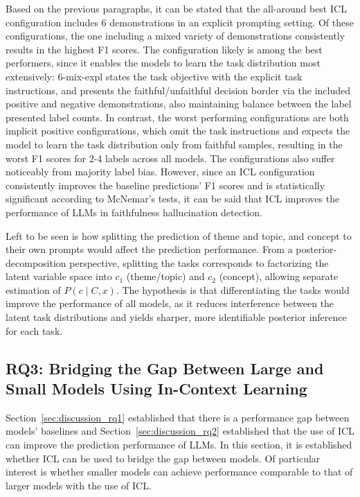 \documentclass[english, 12pt, a4paper, sci, utf8, a-2b, online]{latex/definitions/aaltothesis}
\begin{document}
Based on the previous paragraphs, it can be stated that the all-around best ICL configuration includes 6 demonstrations in an explicit prompting setting. Of these configurations, the one including a mixed variety of demonstrations consistently results in the highest F1 scores. The configuration likely is among the best performers, since it enables the models to learn the task distribution most extensively: 6-mix-expl states the task objective with the explicit task instructions, and presents the faithful/unfaithful decision border via the included positive and negative demonstrations, also maintaining balance between the label presented label counts. In contrast, the worst performing configurations are both implicit positive configurations, which omit the task instructions and expects the model to learn the task distribution only from faithful samples, resulting in the worst F1 scores for 2-4 labels across all models. The configurations also suffer noticeably from majority label bias. However, since an ICL configuration consistently improves the baseline predictions' F1 scores and is statistically significant according to McNemar's tests, it can be said that ICL improves the performance of LLMs in faithfulness hallucination detection.

Left to be seen is how splitting the prediction of theme and topic, and concept to their own prompts would affect the prediction performance. From a posterior-decomposition perspective, splitting the tasks corresponds to factorizing the latent variable space into 
$c_1$ (theme/topic) and $c_2$ (concept), allowing separate estimation of $P(c \mid C, x)$. The hypothesis is that differentiating the tasks would improve the performance of all models, as it reduces interference between the latent task distributions and yields sharper, more identifiable posterior inference for each task.

\subsection{RQ3: Bridging the Gap Between Large and Small Models Using In-Context Learning} \label{sec:discussion_rq3}

Section~\ref{sec:discussion_rq1} established that there is a performance gap between models' baselines and Section~\ref{sec:discussion_rq2} established that the use of ICL can improve the prediction performance of LLMs. In this section, it is established whether ICL can be used to bridge the gap between models. Of particular interest is whether smaller models can achieve performance comparable to that of larger models with the use of ICL.
\end{document}
